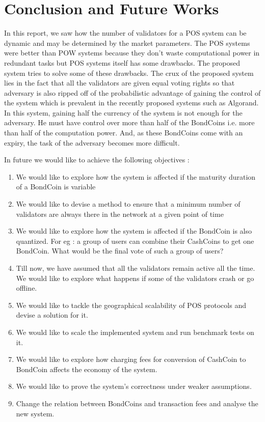 
\chapter{Conclusion and Future Works} %

\label{Chapter 6} %


In this report, we saw how the number of validators for a POS system can be dynamic and may be determined by the market parameters. The POS systems were better than POW systems because they don't waste computational power in redundant tasks but POS systems itself has some drawbacks. The proposed system tries to solve some of these drawbacks. The crux of the proposed system lies in the fact that all the validators are given equal voting rights so that adversary is also ripped off of the probabilistic advantage of gaining the control of the system which is prevalent in the recently proposed systems such as Algorand. In this system, gaining half the currency of the system is not enough for the adversary. He must have control over more than half of the BondCoins i.e. more than half of the computation power. And, as these BondCoins come with an expiry, the task of the adversary becomes more difficult.

In future we would like to achieve the following objectives :
\begin{enumerate}
    \item We would like to explore how the system is affected if the maturity duration of a BondCoin is variable
    \item We would like to devise a method to ensure that a minimum number of validators are always there in the network at a given point of time
    \item We would like to explore how the system is affected if the BondCoin is also quantized. For eg : a group of users can combine their CashCoins to get one BondCoin. What would be the final vote of such a group of users?
    \item Till now, we have assumed that all the validators remain active all the time. We would like to explore what happens if some of the validators crash or go offline.
    \item We would like to tackle the geographical scalability of POS protocols and devise a solution for it.
    \item We would like to scale the implemented system and run benchmark tests on it.
    \item We would like to explore how charging fees for conversion of CashCoin to BondCoin affects the economy of the system.
    \item We would like to prove the system's correctness under weaker assumptions.
    \item Change the relation between BondCoins and transaction fees and analyse the new system.
\end{enumerate}